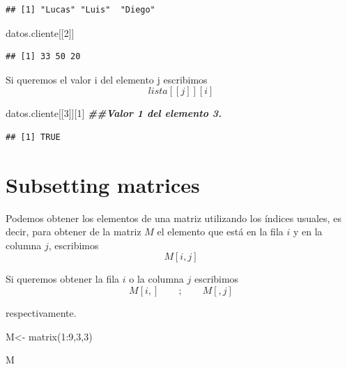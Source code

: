 \documentclass[
  12pt,
]{book}
\newenvironment{Shaded}{\begin{snugshade}}{\end{snugshade}}
\newcommand{\DecValTok}[1]{\textcolor[rgb]{0.00,0.00,0.81}{#1}}
\newcommand{\DocumentationTok}[1]{\textcolor[rgb]{0.56,0.35,0.01}{\textbf{\textit{#1}}}}
\newcommand{\FunctionTok}[1]{\textcolor[rgb]{0.00,0.00,0.00}{#1}}
\newcommand{\NormalTok}[1]{#1}
\newcommand{\OtherTok}[1]{\textcolor[rgb]{0.56,0.35,0.01}{#1}}
\newcommand{\SpecialCharTok}[1]{\textcolor[rgb]{0.00,0.00,0.00}{#1}}
\begin{document}
\begin{verbatim}
## [1] "Lucas" "Luis"  "Diego"
\end{verbatim}

\begin{Shaded}
\begin{Highlighting}[]
\NormalTok{datos.cliente[[}\DecValTok{2}\NormalTok{]]}
\end{Highlighting}
\end{Shaded}

\begin{verbatim}
## [1] 33 50 20
\end{verbatim}

Si queremos el valor i del elemento j escribimos \[lista[[j]][i]\]

\begin{Shaded}
\begin{Highlighting}[]
\NormalTok{datos.cliente[[}\DecValTok{3}\NormalTok{]][}\DecValTok{1}\NormalTok{] }\DocumentationTok{\#\#Valor 1 del elemento 3.}
\end{Highlighting}
\end{Shaded}

\begin{verbatim}
## [1] TRUE
\end{verbatim}

\hypertarget{subsetting-matrices}{%
\section{\texorpdfstring{\textbf{Subsetting matrices}}{Subsetting matrices}}\label{subsetting-matrices}}

Podemos obtener los elementos de una matriz utilizando los índices usuales, es decir, para obtener de la matriz \(M\) el elemento que está en la fila \(i\) y en la columna \(j\), escribimos
\[
M[i,j]
\]

Si queremos obtener la fila \(i\) o la columna \(j\) escribimos
\[
M[i,] \qquad; \qquad M[,j]
\]

respectivamente.

\begin{Shaded}
\begin{Highlighting}[]
\NormalTok{M}\OtherTok{\textless{}{-}} \FunctionTok{matrix}\NormalTok{(}\DecValTok{1}\SpecialCharTok{:}\DecValTok{9}\NormalTok{,}\DecValTok{3}\NormalTok{,}\DecValTok{3}\NormalTok{)}

\NormalTok{M}
\end{Highlighting}
\end{Shaded}
\end{document}
